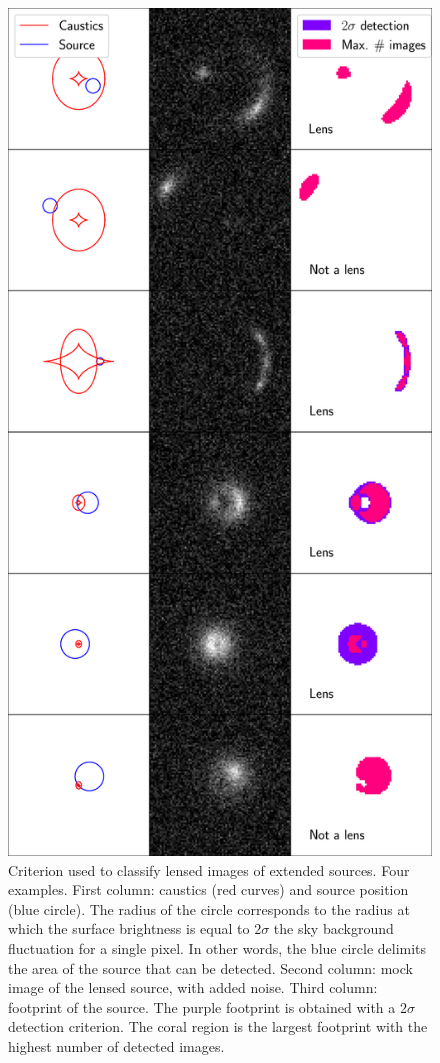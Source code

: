 \documentclass{aa}
\begin{document}
\begin{figure}
\includegraphics[width=\columnwidth]{example_detections.eps}
\caption{
Criterion used to classify lensed images of extended sources. Four examples.
First column: caustics (red curves) and source position (blue circle). The radius of the circle corresponds to the radius at which the surface brightness is equal to $2\sigma$ the sky background fluctuation for a single pixel. In other words, the blue circle delimits the area of the source that can be detected.
Second column: mock image of the lensed source, with added noise.
Third column: footprint of the source. The purple footprint is obtained with a $2\sigma$ detection criterion. The coral region is the largest footprint with the highest number of detected images.
\label{fig:lensdef}
}
\end{figure}
\end{document}
